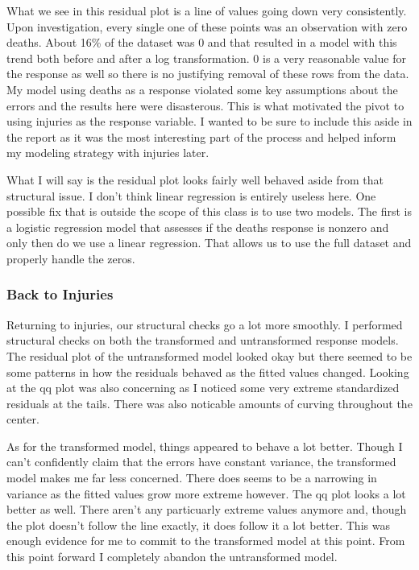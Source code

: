 What we see in this residual plot is a line of values going down very consistently. Upon investigation, every single one of these points was an observation with zero deaths. About 16\% of the dataset was 0 and that resulted in a model with this trend both before and after a log transformation. 0 is a very reasonable value for the response as well so there is no justifying removal of these rows from the data. My model using deaths as a response violated some key assumptions about the errors and the results here were disasterous. This is what motivated the pivot to using injuries as the response variable. I wanted to be sure to include this aside in the report as it was the most interesting part of the process and helped inform my modeling strategy with injuries later.

What I will say is the residual plot looks fairly well behaved aside from that structural issue. I don't think linear regression is entirely useless here. One possible fix that is outside the scope of this class is to use two models. The first is a logistic regression model that assesses if the deaths response is nonzero and only then do we use a linear regression. That allows us to use the full dataset and properly handle the zeros.

\subsubsection*{Back to Injuries}

Returning to injuries, our structural checks go a lot more smoothly. I performed structural checks on both the transformed and untransformed response models. The residual plot of the untransformed model looked okay but there seemed to be some patterns in how the residuals behaved as the fitted values changed. Looking at the qq plot was also concerning as I noticed some very extreme standardized residuals at the tails. There was also noticable amounts of curving throughout the center.

As for the transformed model, things appeared to behave a lot better. Though I can't confidently claim that the errors have constant variance, the transformed model makes me far less concerned. There does seems to be a narrowing in variance as the fitted values grow more extreme however. The qq plot looks a lot better as well. There aren't any particuarly extreme values anymore and, though the plot doesn't follow the line exactly, it does follow it a lot better. This was enough evidence for me to commit to the transformed model at this point. From this point forward I completely abandon the untransformed model.

